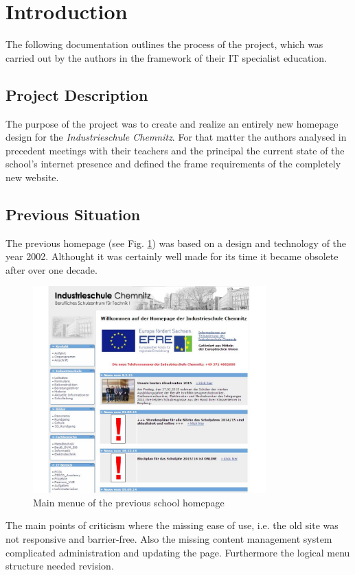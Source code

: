 \section{Introduction}
\label{sec:Introduction}

The following documentation outlines the process of the project, which was carried out by the authors
in the framework of their IT specialist education.

\subsection{Project Description}
\label{sec:ProjectDescription}
The purpose of the project was to create and realize an entirely new homepage design for the \textit{In\-dus\-trie\-schu\-le Chemnitz}. For 
that matter the authors analysed in precedent meetings with their teachers and the principal the current state of the school's
 internet presence and defined the frame requirements of the completely new website.

\subsection{Previous Situation}
\label{sec:PreviousSituation}
The previous homepage (see Fig. \ref{fig:pageOld}) was based on a design and technology of the year 2002. Althought it was certainly well made for its time
it became obsolete after over one decade.
\begin{figure}[ht]
	\centering
	\includegraphics[width=0.80\textwidth]{./Bilder/oldpage.jpg}
	\caption{Main menue of the previous school homepage}
	\label{fig:pageOld}
\end{figure}
The main points of criticism where the missing ease of use, i.e. the old site was not responsive and barrier-free. Also 
the missing content management system complicated administration and updating the page. Furthermore the logical 
menu structure needed revision.


